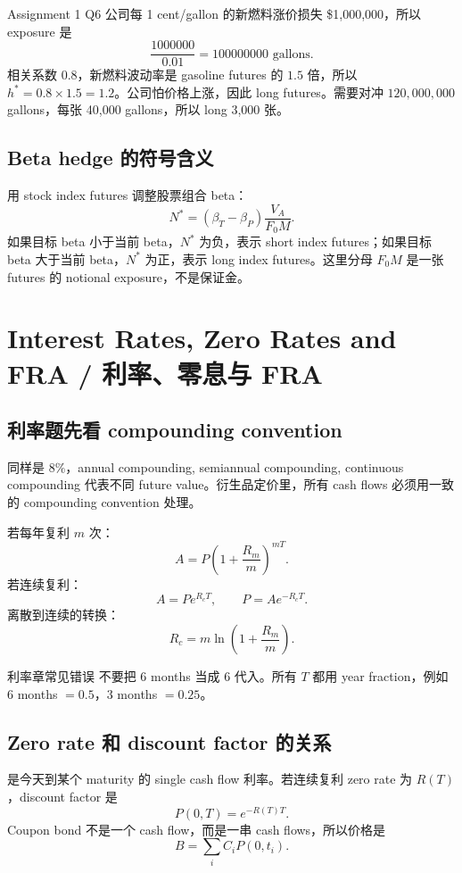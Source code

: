 \begin{examplebox}{Assignment 1 Q6}
公司每 1 cent/gallon 的新燃料涨价损失 \$1,000,000，所以 exposure 是
\[
\frac{1000000}{0.01}=100000000\text{ gallons}.
\]
相关系数 $0.8$，新燃料波动率是 gasoline futures 的 $1.5$ 倍，所以 $h^\ast=0.8\times1.5=1.2$。公司怕价格上涨，因此 long futures。需要对冲 $120,000,000$ gallons，每张 40,000 gallons，所以 long 3,000 张。
\end{examplebox}

\subsection{Beta hedge 的符号含义}
用 stock index futures 调整股票组合 beta：
\[
N^\ast=(\beta_T-\beta_P)\frac{V_A}{F_0M}.
\]
如果目标 beta 小于当前 beta，$N^\ast$ 为负，表示 short index futures；如果目标 beta 大于当前 beta，$N^\ast$ 为正，表示 long index futures。这里分母 $F_0M$ 是一张 futures 的 notional exposure，不是保证金。

\section{Interest Rates, Zero Rates and FRA / 利率、零息与 FRA}

\subsection{利率题先看 compounding convention}
同样是 $8\%$，annual compounding, semiannual compounding, continuous compounding 代表不同 future value。衍生品定价里，所有 cash flows 必须用一致的 compounding convention 处理。

若每年复利 $m$ 次：
\[
A=P\left(1+\frac{R_m}{m}\right)^{mT}.
\]
若连续复利：
\[
A=Pe^{R_cT},\qquad P=Ae^{-R_cT}.
\]
离散到连续的转换：
\[
R_c=m\ln\left(1+\frac{R_m}{m}\right).
\]

\begin{warningbox}{利率章常见错误}
不要把 $6$ months 当成 $6$ 代入。所有 $T$ 都用 year fraction，例如 $6$ months $=0.5$，$3$ months $=0.25$。
\end{warningbox}

\subsection{Zero rate 和 discount factor 的关系}
 是今天到某个 maturity 的 single cash flow 利率。若连续复利 zero rate 为 $R(T)$，discount factor 是
\[
P(0,T)=e^{-R(T)T}.
\]
Coupon bond 不是一个 cash flow，而是一串 cash flows，所以价格是
\[
B=\sum_i C_iP(0,t_i).
\]

